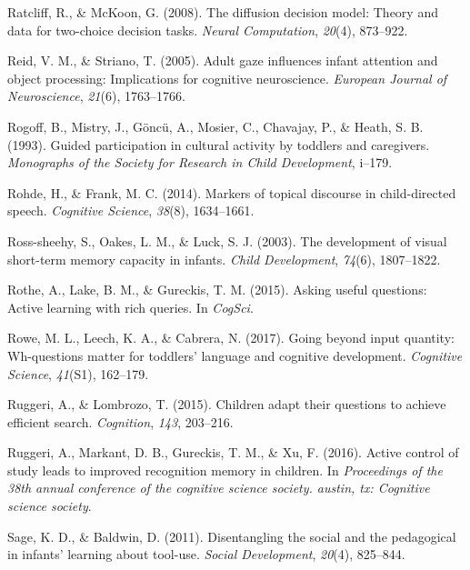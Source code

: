 \documentclass[oneside]{report}
\begin{document}
\hypertarget{ref-ratcliff2008diffusion}{}
Ratcliff, R., \& McKoon, G. (2008). The diffusion decision model: Theory
and data for two-choice decision tasks. \emph{Neural Computation},
\emph{20}(4), 873--922.

\hypertarget{ref-reid2005adult}{}
Reid, V. M., \& Striano, T. (2005). Adult gaze influences infant
attention and object processing: Implications for cognitive
neuroscience. \emph{European Journal of Neuroscience}, \emph{21}(6),
1763--1766.

\hypertarget{ref-rogoff1993guided}{}
Rogoff, B., Mistry, J., Göncü, A., Mosier, C., Chavajay, P., \& Heath,
S. B. (1993). Guided participation in cultural activity by toddlers and
caregivers. \emph{Monographs of the Society for Research in Child
Development}, i--179.

\hypertarget{ref-rohde2014markers}{}
Rohde, H., \& Frank, M. C. (2014). Markers of topical discourse in
child-directed speech. \emph{Cognitive Science}, \emph{38}(8),
1634--1661.

\hypertarget{ref-ross2003development}{}
Ross-sheehy, S., Oakes, L. M., \& Luck, S. J. (2003). The development of
visual short-term memory capacity in infants. \emph{Child Development},
\emph{74}(6), 1807--1822.

\hypertarget{ref-rothe2015asking}{}
Rothe, A., Lake, B. M., \& Gureckis, T. M. (2015). Asking useful
questions: Active learning with rich queries. In \emph{CogSci}.

\hypertarget{ref-rowe2017going}{}
Rowe, M. L., Leech, K. A., \& Cabrera, N. (2017). Going beyond input
quantity: Wh-questions matter for toddlers' language and cognitive
development. \emph{Cognitive Science}, \emph{41}(S1), 162--179.

\hypertarget{ref-ruggeri2015children}{}
Ruggeri, A., \& Lombrozo, T. (2015). Children adapt their questions to
achieve efficient search. \emph{Cognition}, \emph{143}, 203--216.

\hypertarget{ref-ruggeri2016active}{}
Ruggeri, A., Markant, D. B., Gureckis, T. M., \& Xu, F. (2016). Active
control of study leads to improved recognition memory in children. In
\emph{Proceedings of the 38th annual conference of the cognitive science
society. austin, tx: Cognitive science society}.

\hypertarget{ref-sage2011disentangling}{}
Sage, K. D., \& Baldwin, D. (2011). Disentangling the social and the
pedagogical in infants' learning about tool-use. \emph{Social
Development}, \emph{20}(4), 825--844.
\end{document}
